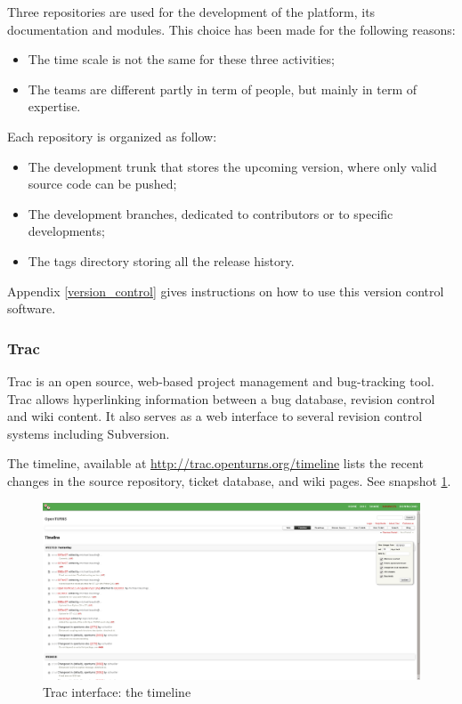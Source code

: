 Three repositories are used for the development of the platform, its documentation and modules. This choice has been made for the following reasons:
\begin{itemize}
\item The time scale is not the same for these three activities;
\item The teams are different partly in term of people, but mainly in term of expertise.
\end{itemize}

Each repository is organized as follow:
\begin{itemize}
\item The development trunk that stores the upcoming version, where only valid source code can be pushed;
\item The development branches, dedicated to contributors or to specific developments;
\item The tags directory storing all the release history.
\end{itemize}

Appendix \ref{version_control} gives instructions on how to use this version control software.

\subsubsection{Trac}

Trac is an open source, web-based project management and bug-tracking tool. Trac allows hyperlinking information between a bug database, revision control and wiki content. It also serves as a web interface to several revision control systems including Subversion.

The timeline, available at \url{http://trac.openturns.org/timeline} lists the recent changes in the source repository, ticket database, and wiki pages. See snapshot \ref{fig:timeline}.

\begin{figure}[ht]
\begin{center}
\includegraphics[scale=0.33]{Figures/Timeline.png}
\caption{Trac interface: the timeline}\label{fig:timeline}
\end{center}
\end{figure}

